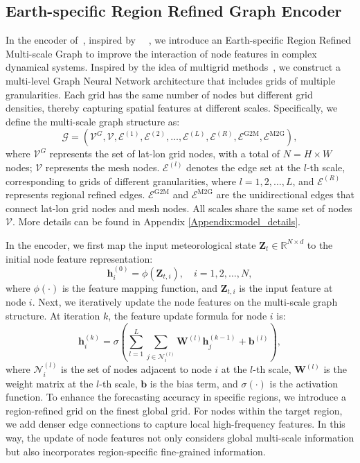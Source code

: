 \subsection{Earth-specific Region Refined Graph Encoder}
In the encoder of~\method{}, inspired by~\cite{fortunato2022multiscale} ~\cite{lam2023learning}, we introduce an Earth-specific Region Refined Multi-scale Graph to improve the interaction of node features in complex dynamical systems. Inspired by the idea of multigrid methods~\cite{he2019mgnet}, we construct a multi-level Graph Neural Network architecture that includes grids of multiple granularities. Each grid has the same number of nodes but different grid densities, thereby capturing spatial features at different scales. Specifically, we define the multi-scale graph structure as:
\begin{equation}
\mathcal{G}=\left(\mathcal{V}^G, \mathcal{V}, \mathcal{E}^{(1)}, \mathcal{E}^{(2)}, \ldots, \mathcal{E}^{(L)}, \mathcal{E}^{(R)}, \mathcal{E}^{\mathrm{G} 2 \mathrm{M}}, \mathcal{E}^{\mathrm{M} 2 \mathrm{G}}\right),
\end{equation}
where ${\mathcal{V}}^{G}$ represents the set of lat-lon grid nodes, with a total of $N = H \times W$ nodes; $\mathcal{V}$ represents the mesh nodes. $\mathcal{E}^{(l)}$ denotes the edge set at the $l$-th scale, corresponding to grids of different granularities, where $l = 1, 2, \dots, L$, and $\mathcal{E}^{(R)}$ represents regional refined edges. $\mathcal{E}^{\mathrm{G} 2 \mathrm{M}}$ and $\mathcal{E}^{\mathrm{M} 2 \mathrm{G}}$ are the unidirectional edges that connect lat-lon grid nodes and mesh nodes. All scales share the same set of nodes $\mathcal{V}$. More details can be found in Appendix \ref{Appendix:model_details}.

In the encoder, we first map the input meteorological state $\mathbf{Z}_t \in \mathbb{R}^{N \times d}$ to the initial node feature representation:
\begin{equation}
\mathbf{h}_i^{(0)} = \phi (\mathbf{Z}_{t, i}), \quad i = 1, 2, \ldots, N,
\end{equation}
where $\phi(\cdot)$ is the feature mapping function, and $\mathbf{Z}_{t,i}$ is the input feature at node $i$. Next, we iteratively update the node features on the multi-scale graph structure. At iteration $k$, the feature update formula for node $i$ is:
\begin{equation}
\mathbf{h}_i^{(k)} = \sigma \left( \sum_{l=1}^L \sum_{j \in \mathcal{N}_i^{(l)}} \mathbf{W}^{(l)} \mathbf{h}_j^{(k-1)} + \mathbf{b}^{(l)} \right),
\end{equation}
where $\mathcal{N}_i^{(l)}$ is the set of nodes adjacent to node $i$ at the $l$-th scale, $\mathbf{W}^{(l)}$ is the weight matrix at the $l$-th scale, $\mathbf{b}$ is the bias term, and $\sigma(\cdot)$ is the activation function. To enhance the forecasting accuracy in specific regions, we introduce a region-refined grid on the finest global grid. For nodes within the target region, we add denser edge connections to capture local high-frequency features. In this way, the update of node features not only considers global multi-scale information but also incorporates region-specific fine-grained information.

